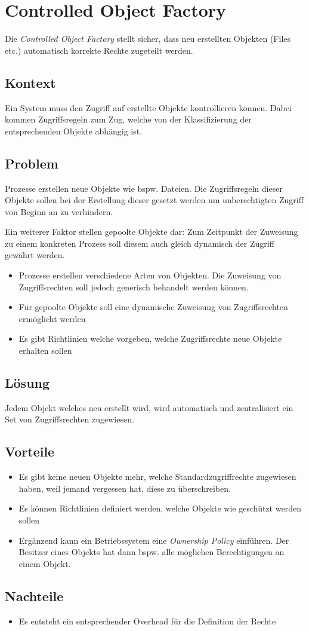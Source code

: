 \section{Controlled Object Factory}
\label{sec:controlled-object-factory}

Die \emph{Controlled Object Factory} stellt sicher, dass neu erstellten Objekten (Files etc.) automatisch korrekte Rechte zugeteilt werden.

\subsection*{Kontext}
Ein System muss den Zugriff auf erstellte Objekte kontrollieren können. Dabei kommen Zugriffsregeln zum Zug, welche von der Klassifizierung der entsprechenden Objekte abhängig ist.

\subsection*{Problem}
Prozesse erstellen neue Objekte wie bspw. Dateien. Die Zugriffsregeln dieser Objekte sollen bei der Erstellung dieser gesetzt werden um unberechtigten Zugriff von Beginn an zu verhindern.

Ein weiterer Faktor stellen gepoolte Objekte dar: Zum Zeitpunkt der Zuweisung zu einem konkreten Prozess soll diesem auch gleich dynamisch der Zugriff gewährt werden.

\begin{itemize}
	\item Prozesse erstellen verschiedene Arten von Objekten. Die Zuweisung von Zugriffsrechten soll jedoch generisch behandelt werden können.
	\item Für gepoolte Objekte soll eine dynamische Zuweisung von Zugriffsrechten ermöglicht werden
	\item Es gibt Richtlinien welche vorgeben, welche Zugriffsrechte neue Objekte erhalten sollen
\end{itemize}


\subsection*{Lösung}
Jedem Objekt welches neu erstellt wird, wird automatisch und zentralisiert ein Set von Zugriffsrechten zugewiesen.


\subsection*{Vorteile}
\begin{itemize}
	\item Es gibt keine neuen Objekte mehr, welche Standardzugriffrechte zugewiesen haben, weil jemand vergessen hat, diese zu überschreiben.
	\item Es können Richtlinien definiert werden, welche Objekte wie geschützt werden sollen
	\item Ergänzend kann ein Betriebssystem eine \emph{Ownership Policy} einführen. Der Besitzer eines Objekts hat dann bspw. alle möglichen Berechtigungen an einem Objekt.
\end{itemize}

\subsection*{Nachteile}
\begin{itemize}
	\item Es entsteht ein entsprechender Overhead für die Definition der Rechte
\end{itemize}